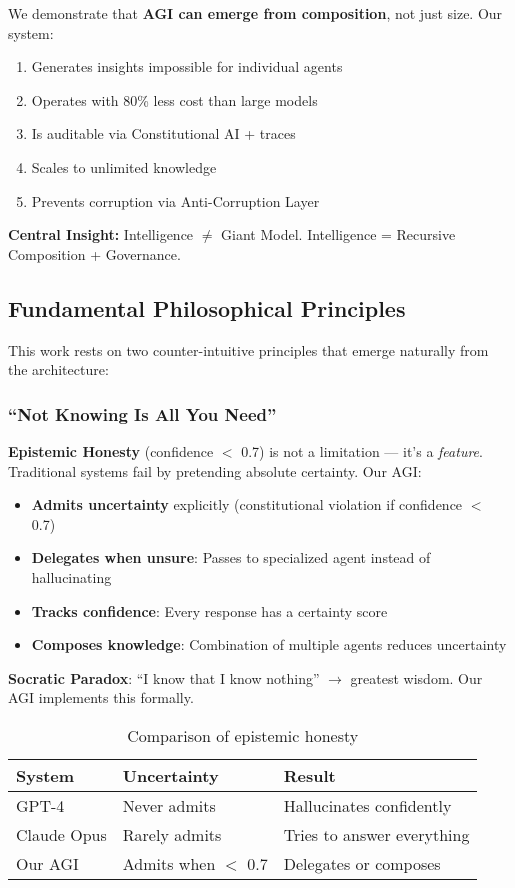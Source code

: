 \documentclass[11pt]{article}
\begin{document}
We demonstrate that \textbf{AGI can emerge from composition}, not just size. Our system:

\begin{enumerate}
    \item Generates insights impossible for individual agents
    \item Operates with 80\% less cost than large models
    \item Is auditable via Constitutional AI + traces
    \item Scales to unlimited knowledge
    \item Prevents corruption via Anti-Corruption Layer
\end{enumerate}

\textbf{Central Insight:} Intelligence $\neq$ Giant Model. Intelligence = Recursive Composition + Governance.

\subsection{Fundamental Philosophical Principles}

This work rests on two counter-intuitive principles that emerge naturally from the architecture:

\subsubsection{``Not Knowing Is All You Need''}

\textbf{Epistemic Honesty} (confidence $<$ 0.7) is not a limitation --- it's a \textit{feature}. Traditional systems fail by pretending absolute certainty. Our AGI:

\begin{itemize}
    \item \textbf{Admits uncertainty} explicitly (constitutional violation if confidence $<$ 0.7)
    \item \textbf{Delegates when unsure}: Passes to specialized agent instead of hallucinating
    \item \textbf{Tracks confidence}: Every response has a certainty score
    \item \textbf{Composes knowledge}: Combination of multiple agents reduces uncertainty
\end{itemize}

\textbf{Socratic Paradox}: ``I know that I know nothing'' $\rightarrow$ greatest wisdom. Our AGI implements this formally.

\begin{table}[H]
\centering
\begin{tabular}{@{}lll@{}}
\toprule
\textbf{System} & \textbf{Uncertainty} & \textbf{Result} \\ \midrule
GPT-4 & Never admits & Hallucinates confidently \\
Claude Opus & Rarely admits & Tries to answer everything \\
Our AGI & Admits when $<$ 0.7 & Delegates or composes \\ \bottomrule
\end{tabular}
\caption{Comparison of epistemic honesty}
\end{table}
\end{document}
